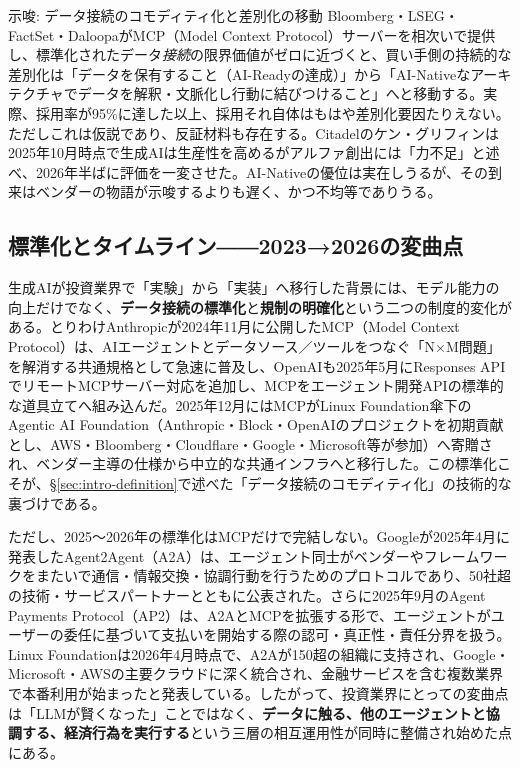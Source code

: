 \begin{insight}{示唆: データ接続のコモディティ化と差別化の移動}
Bloomberg・LSEG・FactSet・DaloopaがMCP（Model Context Protocol）サーバーを相次いで提供し\cite{factset_mcp_nd}、標準化されたデータ\emph{接続}の限界価値がゼロに近づくと、買い手側の持続的な差別化は「データを保有すること（AI-Readyの達成）」から「AI-Nativeなアーキテクチャでデータを解釈・文脈化し行動に結びつけること」へと移動する。実際、採用率が95\%に達した以上、採用それ自体はもはや差別化要因たりえない\cite{x01aima2025,x01ey2025genai}。ただしこれは仮説であり、反証材料も存在する。Citadelのケン・グリフィンは2025年10月時点で生成AIは生産性を高めるがアルファ創出には「力不足」と述べ、2026年半ばに評価を一変させた\cite{griffin2026}。AI-Nativeの優位は実在しうるが、その到来はベンダーの物語が示唆するよりも遅く、かつ不均等でありうる。
\end{insight}

\subsection{標準化とタイムライン――2023→2026の変曲点}
\label{sec:intro-timeline}

生成AIが投資業界で「実験」から「実装」へ移行した背景には、モデル能力の向上だけでなく、\textbf{データ接続の標準化}と\textbf{規制の明確化}という二つの制度的変化がある。とりわけAnthropicが2024年11月に公開したMCP（Model Context Protocol）は、AIエージェントとデータソース／ツールをつなぐ「N×M問題」を解消する共通規格として急速に普及し\cite{x01anthropic2024mcp}、OpenAIも2025年5月にResponses APIでリモートMCPサーバー対応を追加し、MCPをエージェント開発APIの標準的な道具立てへ組み込んだ\cite{x01openai2025responsesmcp}。2025年12月にはMCPがLinux Foundation傘下のAgentic AI Foundation（Anthropic・Block・OpenAIのプロジェクトを初期貢献とし、AWS・Bloomberg・Cloudflare・Google・Microsoft等が参加）へ寄贈され、ベンダー主導の仕様から中立的な共通インフラへと移行した\cite{x01mcp2026foundation}。この標準化こそが、\S\ref{sec:intro-definition}で述べた「データ接続のコモディティ化」の技術的な裏づけである。

ただし、2025〜2026年の標準化はMCPだけで完結しない。Googleが2025年4月に発表したAgent2Agent（A2A）は、エージェント同士がベンダーやフレームワークをまたいで通信・情報交換・協調行動を行うためのプロトコルであり、50社超の技術・サービスパートナーとともに公表された\cite{x01google2025a2a}。さらに2025年9月のAgent Payments Protocol（AP2）は、A2AとMCPを拡張する形で、エージェントがユーザーの委任に基づいて支払いを開始する際の認可・真正性・責任分界を扱う\cite{x01google2025ap2}。Linux Foundationは2026年4月時点で、A2Aが150超の組織に支持され、Google・Microsoft・AWSの主要クラウドに深く統合され、金融サービスを含む複数業界で本番利用が始まったと発表している\cite{x01linuxfoundation2026a2a}。したがって、投資業界にとっての変曲点は「LLMが賢くなった」ことではなく、\textbf{データに触る、他のエージェントと協調する、経済行為を実行する}という三層の相互運用性が同時に整備され始めた点にある。

